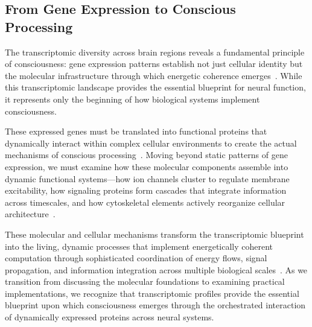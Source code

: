 \subsection*{From Gene Expression to Conscious Processing~}

The transcriptomic diversity across brain regions reveals a fundamental principle of consciousness: gene expression patterns establish not just cellular identity but the molecular infrastructure through which energetic coherence emerges~\cite{Zeng2017, Tasic2018}. While this transcriptomic landscape provides the essential blueprint for neural function, it represents only the beginning of how biological systems implement consciousness.

These expressed genes must be translated into functional proteins that dynamically interact within complex cellular environments to create the actual mechanisms of conscious processing~\cite{Bakken2021, akhlaghpour2022rna}. Moving beyond static patterns of gene expression, we must examine how these molecular components assemble into dynamic functional systems—how ion channels cluster to regulate membrane excitability, how signaling proteins form cascades that integrate information across timescales, and how cytoskeletal elements actively reorganize cellular architecture~\cite{Sudhof2018, Marder2012}.

These molecular and cellular mechanisms transform the transcriptomic blueprint into the living, dynamic processes that implement energetically coherent computation through sophisticated coordination of energy flows, signal propagation, and information integration across multiple biological scales~\cite{Baluska2016, Balchin2016}. As we transition from discussing the molecular foundations to examining practical implementations, we recognize that transcriptomic profiles provide the essential blueprint upon which consciousness emerges through the orchestrated interaction of dynamically expressed proteins across neural systems.
